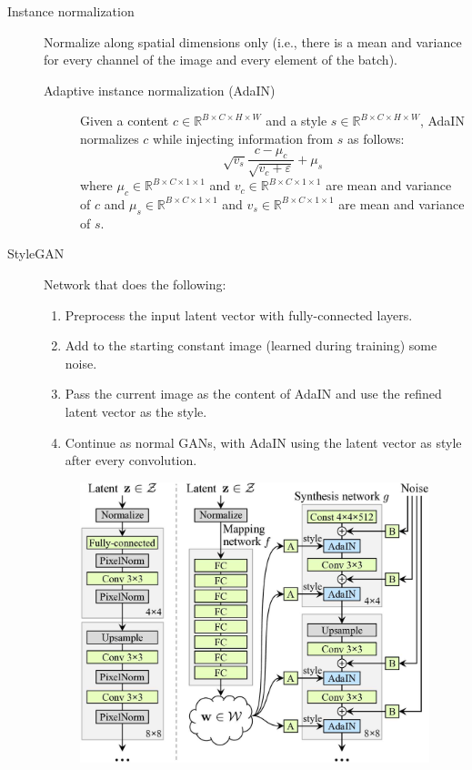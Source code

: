 \begin{description}
    \item[Instance normalization] 
        Normalize along spatial dimensions only (i.e., there is a mean and variance for every channel of the image and every element of the batch).

        \begin{description}
            \item[Adaptive instance normalization (AdaIN)] 
                Given a content $c \in \mathbb{R}^{B \times C \times H \times W}$ and a style $s \in \mathbb{R}^{B \times C \times H \times W}$, AdaIN normalizes $c$ while injecting information from $s$ as follows:
                \[ \sqrt{v_s} \frac{c - \mu_c}{\sqrt{v_c + \varepsilon}} + \mu_s \]
                where $\mu_c \in \mathbb{R}^{B \times C \times 1 \times 1}$ and $v_c \in \mathbb{R}^{B \times C \times 1 \times 1}$ are mean and variance of $c$ and $\mu_s \in \mathbb{R}^{B \times C \times 1 \times 1}$ and $v_s \in \mathbb{R}^{B \times C \times 1 \times 1}$ are mean and variance of $s$.
        \end{description}


    \item[StyleGAN] 
        Network that does the following:
        \begin{enumerate}
            \item Preprocess the input latent vector with fully-connected layers.
            \item Add to the starting constant image (learned during training) some noise.
            \item Pass the current image as the content of AdaIN and use the refined latent vector as the style.
            \item Continue as normal GANs, with AdaIN using the latent vector as style after every convolution.
        \end{enumerate}

        \begin{figure}[H]
            \centering
            \includegraphics[width=0.4\linewidth]{./img/_stylegan.jpg}
        \end{figure}


\end{description}
